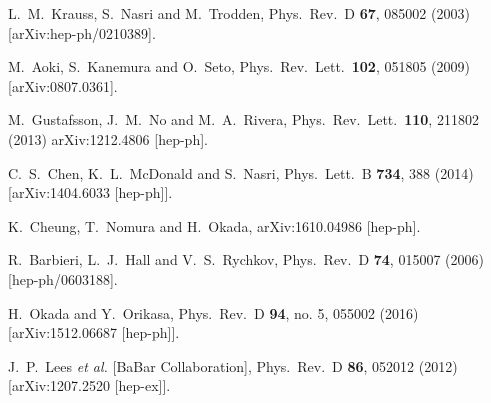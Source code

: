 \documentclass[%
showkeys,12pt,
preprint,preprintnumbers,nofootinbib,
groupedaddress,superscriptaddress,amsmath,amssymb]{revtex4}
\numberwithin{equation}{section}
\begin{document}
\begin{thebibliography}{99}
  
  L.~M.~Krauss, S.~Nasri and M.~Trodden,
  Phys.\ Rev.\  D {\bf 67}, 085002 (2003)
  [arXiv:hep-ph/0210389].

  M.~Aoki, S.~Kanemura and O.~Seto,
  Phys.\ Rev.\ Lett.\  {\bf 102}, 051805 (2009)
  [arXiv:0807.0361].

M.~Gustafsson, J.~M.~No and M.~A.~Rivera,
  Phys.\ Rev.\ Lett.\  {\bf 110}, 211802 (2013)
arXiv:1212.4806 [hep-ph].


  
  C.~S.~Chen, K.~L.~McDonald and S.~Nasri,
  Phys.\ Lett.\ B {\bf 734}, 388 (2014)
  [arXiv:1404.6033 [hep-ph]].



  K.~Cheung, T.~Nomura and H.~Okada,
  arXiv:1610.04986 [hep-ph].

  
  R.~Barbieri, L.~J.~Hall and V.~S.~Rychkov,
  Phys.\ Rev.\ D {\bf 74}, 015007 (2006)
  [hep-ph/0603188].

  H.~Okada and Y.~Orikasa,
  Phys.\ Rev.\ D {\bf 94}, no. 5, 055002 (2016)
  [arXiv:1512.06687 [hep-ph]].

  
  
J.~P.~Lees {\it et al.} [BaBar Collaboration],
  Phys.\ Rev.\ D {\bf 86}, 052012 (2012)
  [arXiv:1207.2520 [hep-ex]].


\end{thebibliography}
\end{document}
